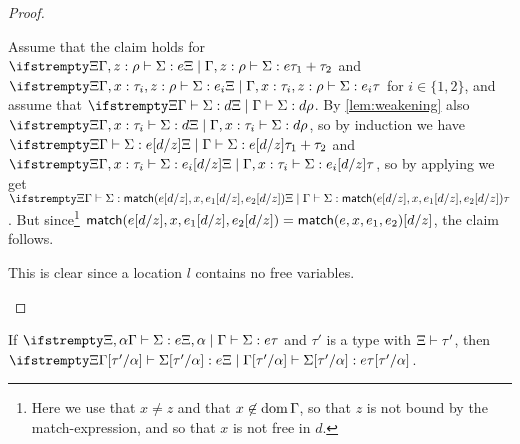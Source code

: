 \begin{proof}
\begin{proofsec}
    \item[\ruleref{Tmatch}]
    Assume that the claim holds for $\typerel{\Xi}{\Gamma, \hastype{z}{\rho}}{\Sigma}{e}{\typeSum{\tau_1}{\tau_2}}$ and $\typerel{\Xi}{\Gamma, \hastype{x}{\tau_i}, \hastype{z}{\rho}}{\Sigma}{e_i}{\tau}$ for $i \in \{1,2\}$, and assume that $\typerel{\Xi}{\Gamma}{\Sigma}{d}{\rho}$. By \cref{lem:weakening} also $\typerel{\Xi}{\Gamma, \hastype{x}{\tau_i}}{\Sigma}{d}{\rho}$, so by induction we have $\typerel{\Xi}{\Gamma}{\Sigma}{e[d/z]}{\typeSum{\tau_1}{\tau_2}}$ and $\typerel{\Xi}{\Gamma, \hastype{x}{\tau_i}}{\Sigma}{e_i[d/z]}{\tau}$, so by applying  we get $\typerel{\Xi}{\Gamma}{\Sigma}{\expMatch{e[d/z]}{x}{e_1[d/z]}{e_2[d/z]}}{\tau}$. But since\footnote{Here we use that $x \neq z$ and that $x \not\in \operatorname{dom}{\Gamma}$, so that $z$ is not bound by the match-expression, and so that $x$ is not free in $d$.} $\mathsf{match}(e[d/z],x,e_1[d/z],e_2[d/z]) = \mathsf{match}(e,x,e_1,e_2)[d/z]$, the claim follows.

    \item[\ruleref{Tloc}]
    This is clear since a location $l$ contains no free variables.
\end{proofsec}
\end{proof}


\begin{lemma}
    \label{lem:type-substitution}
    If $\typerel{\Xi,\alpha}{\Gamma}{\Sigma}{e}{\tau}$ and $\tau'$ is a type with $\Xi \vdash \tau'$, then $\typerel{\Xi}{\Gamma[\tau'/\alpha]}{\Sigma[\tau'/\alpha]}{e}{\tau[\tau'/\alpha]}$.
\end{lemma}

